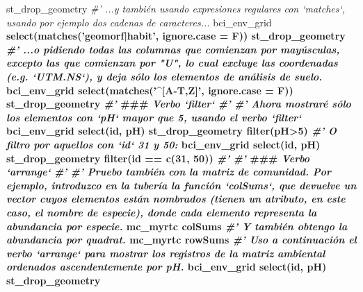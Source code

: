 \documentclass[11pt,]{article}
\newenvironment{Shaded}{\begin{snugshade}}{\end{snugshade}}
\newcommand{\KeywordTok}[1]{\textcolor[rgb]{0.13,0.29,0.53}{\textbf{#1}}}
\newcommand{\DataTypeTok}[1]{\textcolor[rgb]{0.13,0.29,0.53}{#1}}
\newcommand{\DecValTok}[1]{\textcolor[rgb]{0.00,0.00,0.81}{#1}}
\newcommand{\StringTok}[1]{\textcolor[rgb]{0.31,0.60,0.02}{#1}}
\newcommand{\CommentTok}[1]{\textcolor[rgb]{0.56,0.35,0.01}{\textit{#1}}}
\newcommand{\OperatorTok}[1]{\textcolor[rgb]{0.81,0.36,0.00}{\textbf{#1}}}
\newcommand{\AlertTok}[1]{\textcolor[rgb]{0.94,0.16,0.16}{#1}}
\newcommand{\NormalTok}[1]{#1}
\begin{document}
\begin{Shaded}
\begin{Highlighting}[]
{{{{{{{{{{{{{{{{\StringTok{  }\NormalTok{st_drop_geometry}
\CommentTok{#' ...y también usando expresiones regulares con `matches`, usando por ejemplo dos cadenas de caracteres...}
\NormalTok{bci_env_grid }\OperatorTok{%
\StringTok{  }\KeywordTok{select}\NormalTok{(}\KeywordTok{matches}\NormalTok{(}\StringTok{'geomorf|habit'}\NormalTok{, }\DataTypeTok{ignore.case =}\NormalTok{ F)) }\OperatorTok{%
\StringTok{  }\NormalTok{st_drop_geometry}
\CommentTok{#' ...o pidiendo todas las columnas que comienzan por mayúsculas, excepto las que comienzan por "U", lo cual excluye las coordenadas (e.g. `UTM.NS`), y deja sólo los elementos de análisis de suelo.}
\NormalTok{bci_env_grid }\OperatorTok{%
\StringTok{  }\KeywordTok{select}\NormalTok{(}\KeywordTok{matches}\NormalTok{(}\StringTok{'^[A-T,Z]'}\NormalTok{, }\DataTypeTok{ignore.case =}\NormalTok{ F)) }\OperatorTok{%
\StringTok{  }\NormalTok{st_drop_geometry}
\CommentTok{#' }\AlertTok{###}\CommentTok{ Verbo `filter`}
\CommentTok{#' }
\CommentTok{#' Ahora mostraré sólo los elementos con `pH` mayor que 5, usando el verbo `filter`}
\NormalTok{bci_env_grid }\OperatorTok{%
\StringTok{  }\KeywordTok{select}\NormalTok{(id, pH) }\OperatorTok{%
\StringTok{  }\NormalTok{st_drop_geometry }\OperatorTok{%
\StringTok{  }\KeywordTok{filter}\NormalTok{(pH}\OperatorTok{>}\DecValTok{5}\NormalTok{)}
\CommentTok{#' O filtro por aquellos con `id` 31 y 50:}
\NormalTok{bci_env_grid }\OperatorTok{%
\StringTok{  }\KeywordTok{select}\NormalTok{(id, pH) }\OperatorTok{%
\StringTok{  }\NormalTok{st_drop_geometry }\OperatorTok{%
\StringTok{  }\KeywordTok{filter}\NormalTok{(id }\OperatorTok{==}\StringTok{ }\KeywordTok{c}\NormalTok{(}\DecValTok{31}\NormalTok{, }\DecValTok{50}\NormalTok{))}
\CommentTok{#' }
\CommentTok{#' }\AlertTok{###}\CommentTok{ Verbo `arrange`}
\CommentTok{#' }
\CommentTok{#' Pruebo también con la matriz de comunidad. Por ejemplo, introduzco en la tubería la función `colSums`, que devuelve un vector cuyos elementos están nombrados (tienen un atributo, en este caso, el nombre de especie), donde cada elemento representa la abundancia por especie.}
\NormalTok{mc_myrtc }\OperatorTok{%
\StringTok{  }\NormalTok{colSums}
\CommentTok{#' Y también obtengo la abundancia por quadrat.}
\NormalTok{mc_myrtc }\OperatorTok{%
\StringTok{  }\NormalTok{rowSums}
\CommentTok{#' Uso a continuación el verbo `arrange` para mostrar los registros de la matriz ambiental ordenados ascendentemente por pH.}
\NormalTok{bci_env_grid }\OperatorTok{%
\StringTok{  }\KeywordTok{select}\NormalTok{(id, pH) }\OperatorTok{%
\StringTok{  }\NormalTok{st_drop_geometry }\OperatorTok{%
}}}}}}}}}}}}}}}}}}}}}}}}}}}}}}}
\end{Highlighting}
\end{Shaded}
\end{document}
